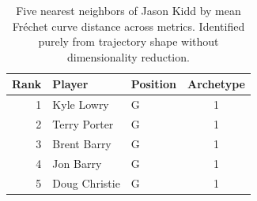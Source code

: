 \begin{table}[htbp]
  \centering\small
  \begin{tabular}{rllc}
    \toprule
    Rank & Player & Position & Archetype \\
    \midrule
    1 & Kyle Lowry & G & 1 \\
    2 & Terry Porter & G & 1 \\
    3 & Brent Barry & G & 1 \\
    4 & Jon Barry & G & 1 \\
    5 & Doug Christie & G & 1 \\
    \bottomrule
  \end{tabular}
  \caption{Five nearest neighbors of Jason Kidd by mean Fr\'{e}chet curve distance across metrics. Identified purely from trajectory shape without dimensionality reduction.}
  \label{tab:Jason_Kidd_frechet_curve_neighbors}
\end{table}

